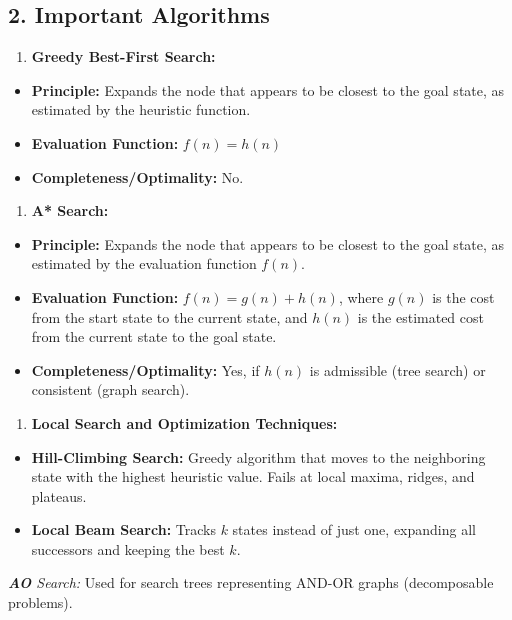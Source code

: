 \subsection{2. Important Algorithms}
\begin{enumerate}
  \item \textbf{Greedy Best-First Search:}
\end{enumerate}
\begin{itemize}
  \item   \textbf{Principle:} Expands the node that appears to be closest to the goal state, as estimated by the heuristic function.
  \item   \textbf{Evaluation Function:} $f(n) = h(n)$
  \item   \textbf{Completeness/Optimality:} No.
\end{itemize}
\begin{enumerate}
  \item \textbf{A* Search:}
\end{enumerate}
\begin{itemize}
  \item   \textbf{Principle:} Expands the node that appears to be closest to the goal state, as estimated by the evaluation function $f(n)$.
  \item   \textbf{Evaluation Function:} $f(n) = g(n) + h(n)$, where $g(n)$ is the cost from the start state to the current state, and $h(n)$ is the estimated cost from the current state to the goal state.
  \item   \textbf{Completeness/Optimality:} Yes, if $h(n)$ is admissible (tree search) or consistent (graph search).
\end{itemize}
\begin{enumerate}
  \item \textbf{Local Search and Optimization Techniques:}
\end{enumerate}
\begin{itemize}
  \item   \textbf{Hill-Climbing Search:} Greedy algorithm that moves to the neighboring state with the highest heuristic value. Fails at local maxima, ridges, and plateaus.
  \item   \textbf{Local Beam Search:} Tracks $k$ states instead of just one, expanding all successors and keeping the best $k$.
\end{itemize}
    \textit{   \textbf{AO} Search:} Used for search trees representing AND-OR graphs (decomposable problems).

